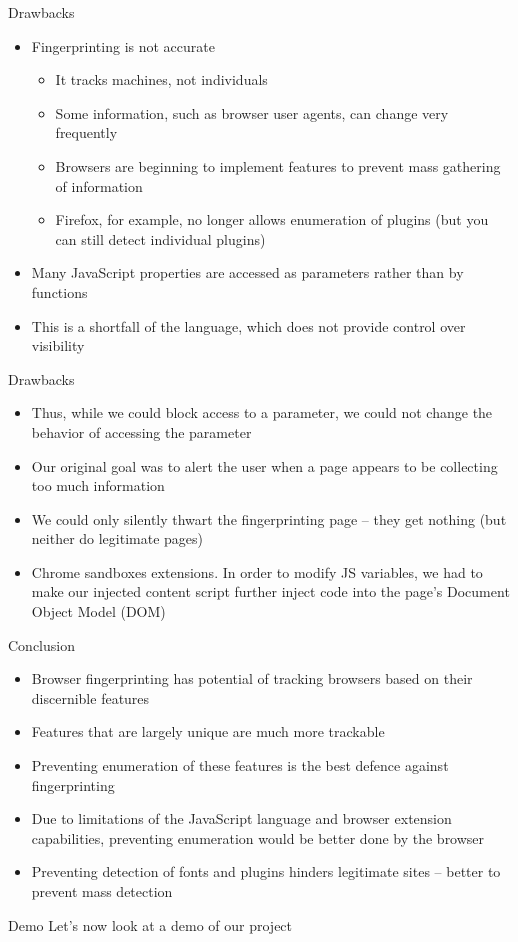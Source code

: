 \begin{frame}[fragile,t]{Drawbacks}
	\begin{itemize}
		\item Fingerprinting is not accurate
		\begin{itemize}
			\item It tracks machines, not individuals
			\item Some information, such as browser user agents, can change very frequently
			\item Browsers are beginning to implement features to prevent mass gathering of information
			\item Firefox, for example, no longer allows enumeration of plugins (but you can still detect individual plugins)
		\end{itemize}
		\item Many JavaScript properties are accessed as parameters rather than by functions
		\item This is a shortfall of the language, which does not provide control over visibility
	\end{itemize}
\end{frame}

\begin{frame}[fragile,t]{Drawbacks}
	\begin{itemize}
		\item Thus, while we could block access to a parameter, we could not change the behavior of accessing the parameter
		\item Our original goal was to alert the user when a page appears to be collecting too much information
		\item We could only silently thwart the fingerprinting page -- they get nothing (but neither do legitimate pages)
		\item Chrome sandboxes extensions. In order to modify JS variables, we had to make our injected content script further inject code into the page's Document Object Model (DOM)
	\end{itemize}
\end{frame}

\begin{frame}[fragile,t]{Conclusion}
	\begin{itemize}
		\item Browser fingerprinting has potential of tracking browsers based on their discernible features
		\item Features that are largely unique are much more trackable
		\item Preventing enumeration of these features is the best defence against fingerprinting
		\item Due to limitations of the JavaScript language and browser extension capabilities, preventing enumeration would be better done by the browser
		\item Preventing detection of fonts and plugins hinders legitimate sites -- better to prevent mass detection
	\end{itemize}
\end{frame}

\begin{frame}[plain]
	\begin{block}{Demo}
		Let's now look at a demo of our project
	\end{block}
\end{frame}
\addtocounter{framenumber}{-1}

